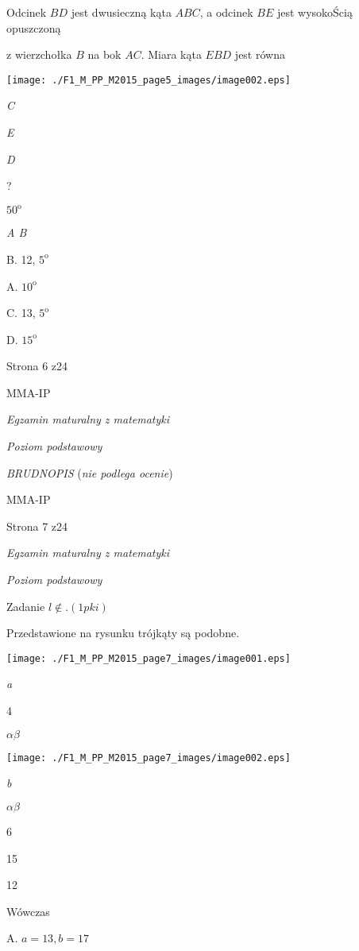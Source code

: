 \documentclass[a4paper,12pt]{article}
\begin{document}
Odcinek $BD$ jest dwusieczną kąta $ABC$, a odcinek $BE$ jest wysokoŚcią opuszczoną

z wierzchołka $B$ na bok $AC$. Miara kąta $EBD$ jest równa
\begin{center}
\texttt{[image: ./F1\_M\_PP\_M2015\_page5\_images/image002.eps]}
\end{center}
{\it C}

{\it E}

{\it D}

?

$50^{\mathrm{o}}$

{\it A  B}

B. 12, $5^{\mathrm{o}}$

A. $10^{\mathrm{o}}$

C. 13, $5^{\mathrm{o}}$

D. $15^{\mathrm{o}}$

Strona 6 z24

MMA-IP





{\it Egzamin maturalny z matematyki}

{\it Poziom podstawowy}

{\it BRUDNOPIS} ({\it nie podlega ocenie})

MMA-IP

Strona 7 z24





{\it Egzamin maturalny z matematyki}

{\it Poziom podstawowy}

Zadanie $l\not\in. (1pki)$

Przedstawione na rysunku trójkąty są podobne.
\begin{center}
\texttt{[image: ./F1\_M\_PP\_M2015\_page7\_images/image001.eps]}
\end{center}
{\it a}

4

$\alpha  \beta$
\begin{center}
\texttt{[image: ./F1\_M\_PP\_M2015\_page7\_images/image002.eps]}
\end{center}
{\it b}

$\alpha  \beta$

6

15

12

Wówczas

A. $a=13, b=17$
\end{document}
